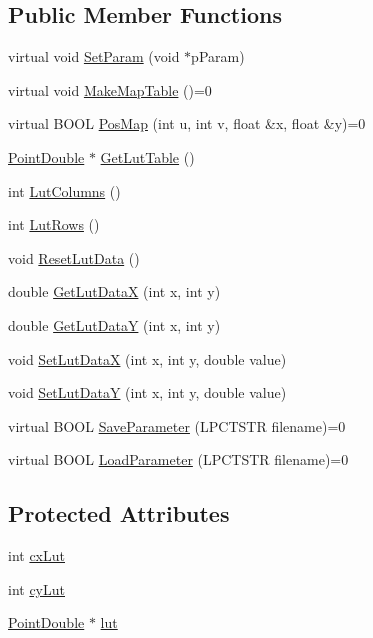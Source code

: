 \subsection*{Public Member Functions}
\begin{DoxyCompactItemize}
\item 
virtual void \mbox{\hyperlink{class_process_wrap_a6c7130837d4713b0462f42cfc25aca98}{Set\+Param}} (void $\ast$p\+Param)
\item 
virtual void \mbox{\hyperlink{class_process_wrap_a22910a91f52147b8631b7e880509996e}{Make\+Map\+Table}} ()=0
\item 
virtual B\+O\+OL \mbox{\hyperlink{class_process_wrap_a536c940a16b6331109aa5d30763974fe}{Pos\+Map}} (int u, int v, float \&x, float \&y)=0
\item 
\mbox{\hyperlink{struct___point_double}{Point\+Double}} $\ast$ \mbox{\hyperlink{class_process_wrap_a69ce0c8809b27258dd416b4a806b347d}{Get\+Lut\+Table}} ()
\item 
int \mbox{\hyperlink{class_process_wrap_a14eafff7a715fb84f7b3a3b2dc37bd0c}{Lut\+Columns}} ()
\item 
int \mbox{\hyperlink{class_process_wrap_a805d35317ea071adec5d6a4497608e43}{Lut\+Rows}} ()
\item 
void \mbox{\hyperlink{class_process_wrap_a8a33b5609c68b5273cddbdd28dd9881b}{Reset\+Lut\+Data}} ()
\item 
double \mbox{\hyperlink{class_process_wrap_a21c63fcb4fec0ca44ad0d8dcd41d1fa3}{Get\+Lut\+DataX}} (int x, int y)
\item 
double \mbox{\hyperlink{class_process_wrap_a644d6814dc0d8d744470d81862900ff8}{Get\+Lut\+DataY}} (int x, int y)
\item 
void \mbox{\hyperlink{class_process_wrap_a8e4e346bc28b54e1f789ed6c7d3cd0f4}{Set\+Lut\+DataX}} (int x, int y, double value)
\item 
void \mbox{\hyperlink{class_process_wrap_a86c91328a42d3a3bee76507595050fd1}{Set\+Lut\+DataY}} (int x, int y, double value)
\item 
virtual B\+O\+OL \mbox{\hyperlink{class_process_wrap_aa5d4361a42a7a65cac877beb6d4ffa97}{Save\+Parameter}} (L\+P\+C\+T\+S\+TR filename)=0
\item 
virtual B\+O\+OL \mbox{\hyperlink{class_process_wrap_a1cb75a423ff8f5ef736fc00a34792493}{Load\+Parameter}} (L\+P\+C\+T\+S\+TR filename)=0
\end{DoxyCompactItemize}
\subsection*{Protected Attributes}
\begin{DoxyCompactItemize}
\item 
int \mbox{\hyperlink{class_process_wrap_aa7b1b1ab80a42889823b0357de5d3c4a}{cx\+Lut}}
\item 
int \mbox{\hyperlink{class_process_wrap_ab18b53afcd7d7b0d941a45a9c89e177c}{cy\+Lut}}
\item 
\mbox{\hyperlink{struct___point_double}{Point\+Double}} $\ast$ \mbox{\hyperlink{class_process_wrap_a39358a35e911d631f6bd46f6bf815d25}{lut}}
\end{DoxyCompactItemize}


